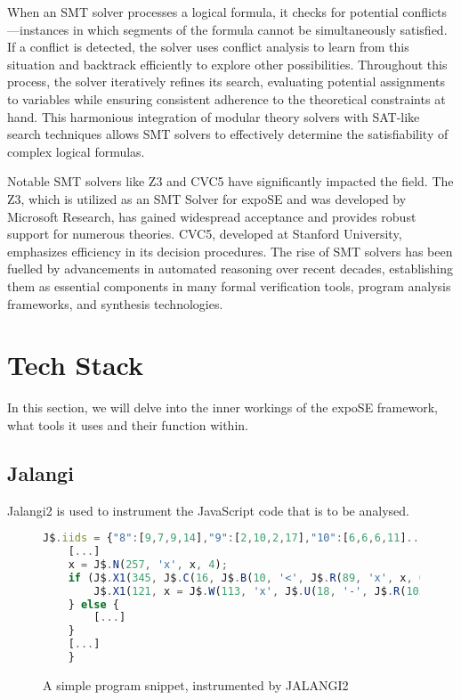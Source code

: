 When an SMT solver processes a logical formula, it checks for potential conflicts—instances in which segments of the formula cannot be simultaneously satisfied. If a conflict is detected, the solver uses conflict analysis to learn from this situation and backtrack efficiently to explore other possibilities. Throughout this process, the solver iteratively refines its search, evaluating potential assignments to variables while ensuring consistent adherence to the theoretical constraints at hand. This harmonious integration of modular theory solvers with SAT-like search techniques allows SMT solvers to effectively determine the satisfiability of complex logical formulas.\cite[p. 2]{barrett_satisfiability_2009}


Notable SMT solvers like Z3 and CVC5 have significantly impacted the field. The Z3, which is utilized as an SMT Solver for expoSE and was developed by Microsoft Research, has gained widespread acceptance and provides robust support for numerous theories. CVC5, developed at Stanford University, emphasizes efficiency in its decision procedures. The rise of SMT solvers has been fuelled by advancements in automated reasoning over recent decades, establishing them as essential components in many formal verification tools, program analysis frameworks, and synthesis technologies.\cite{barrett_satisfiability_2009}


\section{Tech Stack}
\label{sec:tech}
In this section, we will delve into the inner workings of the expoSE framework, what tools it uses and their function within. 




\subsection{Jalangi}
\label{sec:jalangi}

Jalangi2 is used to instrument the JavaScript code that is to be analysed. 
\begin{figure}[ht]
    \begin{lstlisting}[language=JavaScript, gobble=4]
    J$.iids = {"8":[9,7,9,14],"9":[2,10,2,17],"10":[6,6,6,11]...,"nBranches":6}
    [...]
    x = J$.N(257, 'x', x, 4);
    if (J$.X1(345, J$.C(16, J$.B(10, '<', J$.R(89, 'x', x, 0), J$.T(97, 0, 22, false), 0)))) {
        J$.X1(121, x = J$.W(113, 'x', J$.U(18, '-', J$.R(105, 'x', x, 0)), x, 0));
    } else {
        [...]
    }
    [...]
    }

    \end{lstlisting}
    \caption{A simple program snippet, instrumented by JALANGI2}
    \label{fig:code-snippet}
\end{figure}
 

